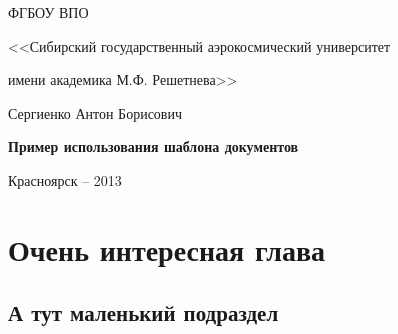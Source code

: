 \documentclass[a4paper,12pt]{report}
\begin{document}

\thispagestyle{empty}

\begin{center}
ФГБОУ ВПО \par
<<Сибирский государственный аэрокосмический университет \par имени академика М.Ф. Решетнева>>\par 
\par
\end{center}

\vspace{50mm}

\begin{center}
{\large Сергиенко Антон Борисович}
\end{center}

\vspace{5mm}
\begin{center}
{\bf \large Пример использования шаблона документов
\par}

\vspace{20mm}

\end{center}

\vspace{100mm}


\begin{center}
{Красноярск -- 2013}
\end{center}

\tableofcontents
\clearpage


\chapter{Очень интересная глава}

\section {А тут маленький подраздел}
\end{document}
